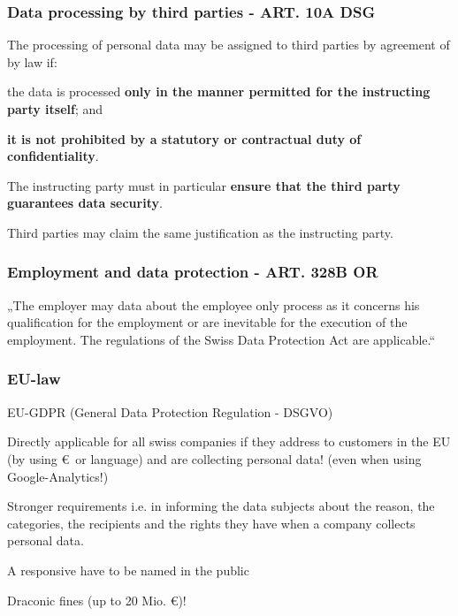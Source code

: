 \subsubsection{Data processing by third parties - ART. 10A DSG}
\begin{compactenum}	
	\item The processing of personal data may be assigned to third parties by agreement of by law if:
	\begin{compactenum}	
		\item the data is processed \textbf{only in the manner permitted for the instructing party itself}; and
		\item \textbf{it is not prohibited by a statutory or contractual duty of confidentiality}.
	\end{compactenum}
	\item The instructing party must in particular \textbf{ensure that the third party guarantees data security}.
	\item Third parties may claim the same justification as the instructing party.
\end{compactenum}

\subsubsection{Employment and data protection - ART. 328B OR}
„The employer may data about the employee only process as it concerns his qualification for the employment or are inevitable for the execution of the employment. The regulations of the Swiss Data Protection Act are applicable.“

\subsubsection{EU-law}
\begin{compactitem}	
	\item EU-GDPR (General Data Protection Regulation - DSGVO)
	\item Directly applicable for all swiss companies if they address to customers in the EU (by using \euro\ or language) and are collecting personal data! (even when using Google-Analytics!)
	\item Stronger requirements i.e. in informing the data subjects about the reason, the categories, the recipients and the rights they have when a company collects personal data.
	\item A responsive have to be named in the public
	\item Draconic fines (up to 20 Mio. \euro)!
\end{compactitem}